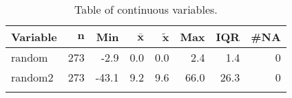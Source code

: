 {\footnotesize
\begin{longtable}{lrrrrrrr}
\caption{Table of continuous variables.} \\ 
 \textbf{Variable} & $\mathbf{n}$ & \textbf{Min} & $\mathbf{\bar{x}}$ & $\mathbf{\widetilde{x}}$ & \textbf{Max} & \textbf{IQR} & \textbf{\#NA} \\ 
  \hline
random & 273 &  -2.9 & 0.0 & 0.0 &  2.4 &  1.4 & 0 \\ 
  random2 & 273 & -43.1 & 9.2 & 9.6 & 66.0 & 26.3 & 0 \\ 
  \hline
\label{tab:table4}
\end{longtable}
}
